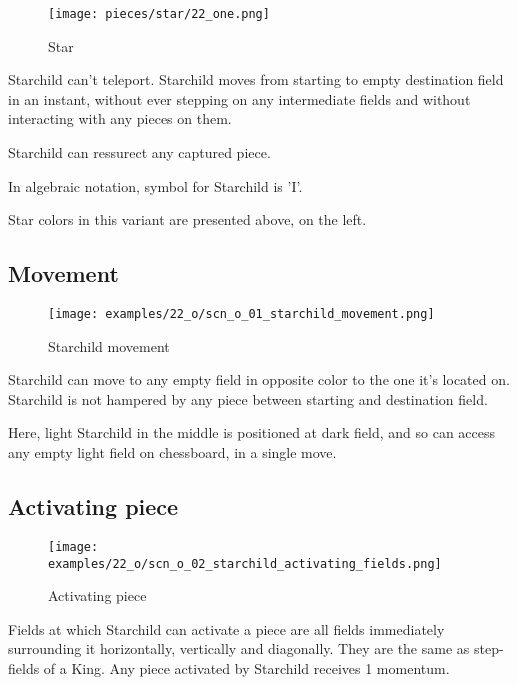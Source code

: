 \noindent
\begin{wrapfigure}[10]{l}{0.4\textwidth}
\centering
\texttt{[image: pieces/star/22\_one.png]}
\caption{Star}
\label{fig:star/22_one}
\end{wrapfigure}
Starchild can't teleport. Starchild moves from starting to empty destination field in
an instant, without ever stepping on any intermediate fields and without interacting
with any pieces on them.

Starchild can ressurect any captured piece.

In algebraic notation, symbol for Starchild is 'I'.

Star colors in this variant are presented above, on the left.

\clearpage %

\subsection*{Movement}

\vspace*{-1.1\baselineskip}
\noindent
\begin{figure}[!h]
\texttt{[image: examples/22\_o/scn\_o\_01\_starchild\_movement.png]}
\caption{Starchild movement}
\label{fig:scn_o_01_starchild_movement}
\end{figure}

Starchild can move to any empty field in opposite color to the one it's located on.
Starchild is not hampered by any piece between starting and destination field.

Here, light Starchild in the middle is positioned at dark field, and so can access
any empty light field on chessboard, in a single move.

\clearpage %

\subsection*{Activating piece}

\vspace*{-0.9\baselineskip}
\noindent
\begin{wrapfigure}[8]{l}{0.4\textwidth}
\centering
\texttt{[image: examples/22\_o/scn\_o\_02\_starchild\_activating\_fields.png]}
\caption{Activating piece}
\label{fig:scn_o_02_starchild_activating_fields}
\end{wrapfigure}
Fields at which Starchild can activate a piece are all fields immediately surrounding
it horizontally, vertically and diagonally. They are the same as step-fields of a King.
Any piece activated by Starchild receives 1 momentum.

